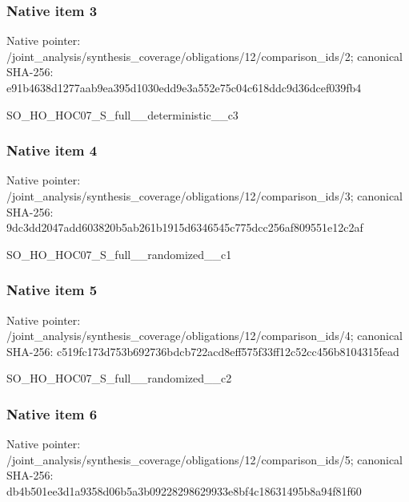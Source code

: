 \documentclass[10pt,a4paper]{article}
\begin{document}
\subsubsection{Native item 3}
Native pointer: /joint\_\allowbreak{}analysis/synthesis\_\allowbreak{}coverage/obligations/12/comparison\_\allowbreak{}ids/2; canonical SHA-256: e91b4638d1277aab9ea395d1030edd9e3a552e75c04c618ddc9d36dcef039fb4

\begingroup\raggedright\sloppy SO\_\allowbreak{}HO\_\allowbreak{}HOC07\_\allowbreak{}S\_\allowbreak{}full\_\allowbreak{}\_\allowbreak{}deterministic\_\allowbreak{}\_\allowbreak{}c3\par\endgroup

\subsubsection{Native item 4}
Native pointer: /joint\_\allowbreak{}analysis/synthesis\_\allowbreak{}coverage/obligations/12/comparison\_\allowbreak{}ids/3; canonical SHA-256: 9dc3dd2047add603820b5ab261b1915d6346545c775dcc256af809551e12c2af

\begingroup\raggedright\sloppy SO\_\allowbreak{}HO\_\allowbreak{}HOC07\_\allowbreak{}S\_\allowbreak{}full\_\allowbreak{}\_\allowbreak{}randomized\_\allowbreak{}\_\allowbreak{}c1\par\endgroup

\subsubsection{Native item 5}
Native pointer: /joint\_\allowbreak{}analysis/synthesis\_\allowbreak{}coverage/obligations/12/comparison\_\allowbreak{}ids/4; canonical SHA-256: c519fc173d753b692736bdcb722acd8eff575f33ff12c52cc456b8104315fead

\begingroup\raggedright\sloppy SO\_\allowbreak{}HO\_\allowbreak{}HOC07\_\allowbreak{}S\_\allowbreak{}full\_\allowbreak{}\_\allowbreak{}randomized\_\allowbreak{}\_\allowbreak{}c2\par\endgroup

\subsubsection{Native item 6}
Native pointer: /joint\_\allowbreak{}analysis/synthesis\_\allowbreak{}coverage/obligations/12/comparison\_\allowbreak{}ids/5; canonical SHA-256: db4b501ee3d1a9358d06b5a3b09228298629933e8bf4c18631495b8a94f81f60
\end{document}
